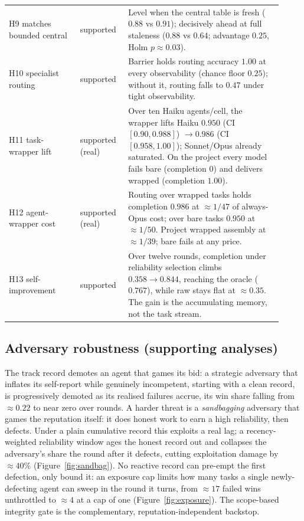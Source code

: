 \documentclass[11pt]{article}
\begin{document}
\begin{table}[t]
\begin{tabular}{@{}p{0.24\linewidth}p{0.16\linewidth}p{0.52\linewidth}@{}}
H9 matches bounded central & supported & Level when the central table is fresh ($0.88$ vs $0.91$); decisively ahead at full staleness ($0.88$ vs $0.64$; advantage $0.25$, Holm $p\approx0.03$). \\
H10 specialist routing & supported & Barrier holds routing accuracy $1.00$ at every observability (chance floor $0.25$); without it, routing falls to $0.47$ under tight observability. \\
H11 task-wrapper lift & supported (real) & Over ten Haiku agents/cell, the wrapper lifts Haiku $0.950$ (CI $[0.90,0.988]$) $\to0.986$ (CI $[0.958,1.00]$); Sonnet/Opus already saturated. On the project every model fails bare (completion $0$) and delivers wrapped (completion $1.00$). \\
H12 agent-wrapper cost & supported (real) & Routing over wrapped tasks holds completion $0.986$ at $\approx 1/47$ of always-Opus cost; over bare tasks $0.950$ at $\approx 1/50$. Project wrapped assembly at $\approx 1/39$; bare fails at any price. \\
H13 self-improvement & supported & Over twelve rounds, completion under reliability selection climbs $0.358\to0.844$, reaching the oracle ($0.767$), while raw stays flat at $\approx 0.35$. The gain is the accumulating memory, not the task stream. \\
\bottomrule
\end{tabular}
\end{table}

\subsection{Adversary robustness (supporting analyses)}
The track record demotes an agent that games its bid: a strategic adversary that inflates its self-report while genuinely incompetent, starting with a clean record, is progressively demoted as its realised failures accrue, its win share falling from $\approx 0.22$ to near zero over rounds. A harder threat is a \emph{sandbagging} adversary that games the reputation itself: it does honest work to earn a high reliability, then defects. Under a plain cumulative record this exploits a real lag; a recency-weighted reliability window ages the honest record out and collapses the adversary's share the round after it defects, cutting exploitation damage by $\approx 40\%$ (Figure~\ref{fig:sandbag}). No reactive record can pre-empt the first defection, only bound it: an exposure cap limits how many tasks a single newly-defecting agent can sweep in the round it turns, from $\approx 17$ failed wins unthrottled to $\approx 4$ at a cap of one (Figure~\ref{fig:exposure}). The scope-based integrity gate is the complementary, reputation-independent backstop.
\end{document}
